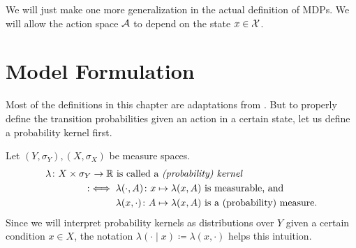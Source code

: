 We will just make one more generalization in the actual definition of MDPs. We will allow the action space \(\mathcal{A}\) to depend on the state \(x\in\mathcal{X}\).

\section{Model Formulation}
Most of the definitions in this chapter are adaptations from \textcite{szepesvariAlgorithmsReinforcementLearning2010}.
But to properly define the transition probabilities given an action in a certain state, let us define a probability kernel first.

\begin{definition}[Kernel]
	Let \((Y,\sigma_Y), (X,\sigma_X)\) be measure spaces.
	\begin{align*}
		&\lambda\colon X\times\sigma_Y\to \mathbb{R} \text{ is called a \emph{(probability) kernel}}\\
		&\qquad \qquad :\iff 
		\begin{aligned}[t]
			&\lambda(\cdot,A)\colon x\mapsto \lambda(x,A) \text{ is measurable, and}\\
			&\lambda(x,\cdot)\colon A\mapsto \lambda(x,A) \text{ is a (probability) measure.}
		\end{aligned}
	\end{align*}
	Since we will interpret probability kernels as distributions over \(Y\) given a  certain condition \(x\in X\), the notation \(\lambda(\cdot\mid x) \coloneqq \lambda(x,\cdot)\) helps this intuition. 
\end{definition}

